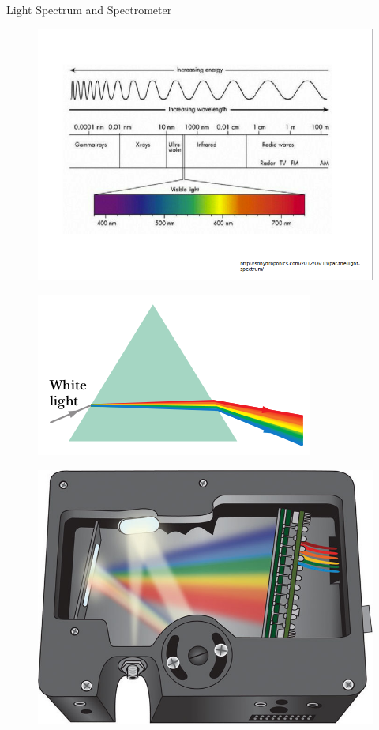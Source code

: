 \documentclass[10pt]{beamer}
\begin{document}
	\begin{frame}{Light Spectrum and Spectrometer}
				\begin{minipage}{0.47\textwidth}
				\begin{figure}
				\includegraphics[scale=0.25]{light.png}
				\end{figure}
				\end{minipage}
				\begin{minipage}{0.5\textwidth}
				\begin{figure}
				\includegraphics[scale=0.25]{prism.png}
				\end{figure}
				\begin{figure}
				\includegraphics[scale=0.15]{spectrometer.jpg}
				\end{figure}
				\end{minipage}
	
	\end{frame}
	
\end{document}
